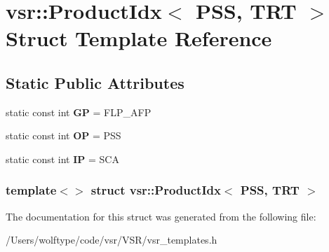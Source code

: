 \hypertarget{structvsr_1_1_product_idx_3_01_p_s_s_00_01_t_r_t_01_4}{\section{vsr\-:\-:Product\-Idx$<$ P\-S\-S, T\-R\-T $>$ Struct Template Reference}
\label{structvsr_1_1_product_idx_3_01_p_s_s_00_01_t_r_t_01_4}
}
\subsection*{Static Public Attributes}
\begin{DoxyCompactItemize}
\item 
\hypertarget{structvsr_1_1_product_idx_3_01_p_s_s_00_01_t_r_t_01_4_ad5cf86620000e8e2f8d41d38d293d1e4}{static const int {\bfseries G\-P} = F\-L\-P\-\_\-\-A\-F\-P}\label{structvsr_1_1_product_idx_3_01_p_s_s_00_01_t_r_t_01_4_ad5cf86620000e8e2f8d41d38d293d1e4}

\item 
\hypertarget{structvsr_1_1_product_idx_3_01_p_s_s_00_01_t_r_t_01_4_af1aabb254b5913ae60ac3c1ab9166593}{static const int {\bfseries O\-P} = P\-S\-S}\label{structvsr_1_1_product_idx_3_01_p_s_s_00_01_t_r_t_01_4_af1aabb254b5913ae60ac3c1ab9166593}

\item 
\hypertarget{structvsr_1_1_product_idx_3_01_p_s_s_00_01_t_r_t_01_4_ab1f706c45f069f9156a24fc7e999ac21}{static const int {\bfseries I\-P} = S\-C\-A}\label{structvsr_1_1_product_idx_3_01_p_s_s_00_01_t_r_t_01_4_ab1f706c45f069f9156a24fc7e999ac21}

\end{DoxyCompactItemize}
\subsubsection*{template$<$$>$ struct vsr\-::\-Product\-Idx$<$ P\-S\-S, T\-R\-T $>$}



The documentation for this struct was generated from the following file\-:\begin{DoxyCompactItemize}
\item 
/\-Users/wolftype/code/vsr/\-V\-S\-R/vsr\-\_\-templates.\-h\end{DoxyCompactItemize}
